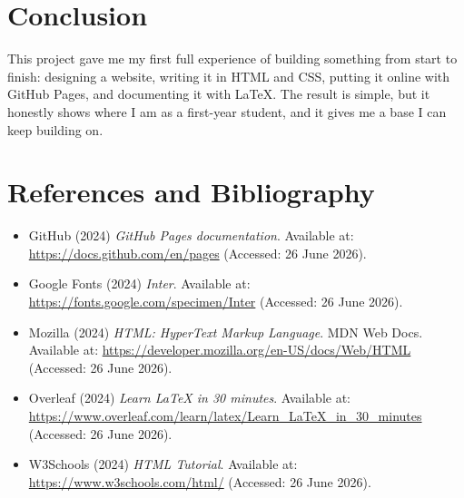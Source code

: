 \documentclass[11pt,a4paper]{article}
\begin{document}
\section{Conclusion}

This project gave me my first full experience of building something from start to finish:
designing a website, writing it in HTML and CSS, putting it online with GitHub Pages, and
documenting it with LaTeX. The result is simple, but it honestly shows where I am as a
first-year student, and it gives me a base I can keep building on.

\section*{References and Bibliography}
\begin{itemize}[leftmargin=1.4em, itemsep=4pt, topsep=4pt, label={}]
  \item GitHub (2024) \textit{GitHub Pages documentation}. Available at:
        \url{https://docs.github.com/en/pages} (Accessed: 26 June 2026).
  \item Google Fonts (2024) \textit{Inter}. Available at:
        \url{https://fonts.google.com/specimen/Inter} (Accessed: 26 June 2026).
  \item Mozilla (2024) \textit{HTML: HyperText Markup Language}. MDN Web Docs. Available at:
        \url{https://developer.mozilla.org/en-US/docs/Web/HTML} (Accessed: 26 June 2026).
  \item Overleaf (2024) \textit{Learn LaTeX in 30 minutes}. Available at:
        \url{https://www.overleaf.com/learn/latex/Learn_LaTeX_in_30_minutes} (Accessed: 26 June 2026).
  \item W3Schools (2024) \textit{HTML Tutorial}. Available at:
        \url{https://www.w3schools.com/html/} (Accessed: 26 June 2026).
\end{itemize}
\end{document}
